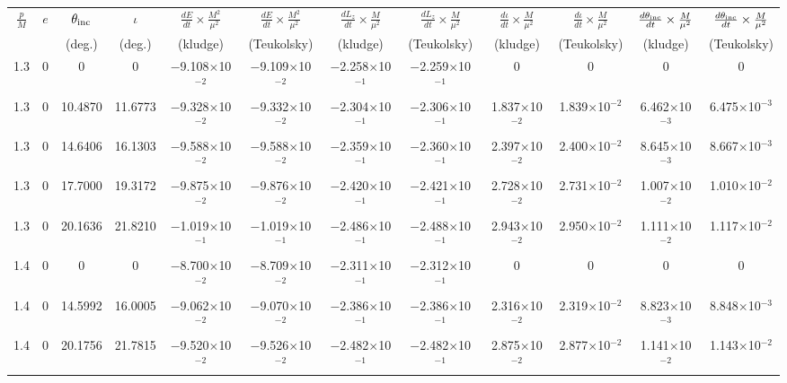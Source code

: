 \documentclass[aps,prd,twocolumn,showpacs,groupedaddress,nofootinbib]{revtex4}
\newcommand\T{\rule{0pt}{3ex}}
\newcommand\B{\rule[-2ex]{0pt}{0pt}}
\begin{document}
\begin{widetext}
\begin{table}[h]
\begin{tabular}{|c|c|c|c|c|c|c|c|c|c|c|c|}
\hline
 \T\B$\frac{p}{M}$ & $e$ & $\theta_{\rm inc}$& $\iota$& $\frac{dE}{dt}\times\frac{M^2}{\mu^2}$ & $\frac{dE}{dt}\times\frac{M^2}{\mu^2}$ & $\frac{dL_z}{dt}\times\frac{M}{\mu^2}$ & $\frac{dL_z}{dt}\times\frac{M}{\mu^2}$ & $\frac{d\iota}{dt}\times\frac{M}{\mu^2}$& $\frac{d\iota}{dt}\times\frac{M}{\mu^2}$& $\frac{d\theta_{\rm inc}}{dt}\times\frac{M}{\mu^2}$& $\frac{d\theta_{\rm inc}}{dt}\times\frac{M}{\mu^2}$\\
&&(deg.)&(deg.)& (kludge) & (Teukolsky) & (kludge) & (Teukolsky)& (kludge) & (Teukolsky)& (kludge) & (Teukolsky)\\
\hline
\T 

  1.3&  0&  0&  0& $-$9.108$\times$10$^{-2}$& $-$9.109$\times$10$^{-2}$& $-$2.258$\times$10$^{-1}$& $-$2.259$\times$10$^{-1}$&  0&  0&  0&  0\\
  1.3&  0& 10.4870& 11.6773& $-$9.328$\times$10$^{-2}$& $-$9.332$\times$10$^{-2}$& $-$2.304$\times$10$^{-1}$& $-$2.306$\times$10$^{-1}$&  1.837$\times$10$^{-2}$&  1.839$\times$10$^{-2}$&  6.462$\times$10$^{-3}$&  6.475$\times$10$^{-3}$\\
  1.3&  0& 14.6406& 16.1303& $-$9.588$\times$10$^{-2}$& $-$9.588$\times$10$^{-2}$& $-$2.359$\times$10$^{-1}$& $-$2.360$\times$10$^{-1}$&  2.397$\times$10$^{-2}$&  2.400$\times$10$^{-2}$&  8.645$\times$10$^{-3}$&  8.667$\times$10$^{-3}$\\
  1.3&  0& 17.7000& 19.3172& $-$9.875$\times$10$^{-2}$& $-$9.876$\times$10$^{-2}$& $-$2.420$\times$10$^{-1}$& $-$2.421$\times$10$^{-1}$&  2.728$\times$10$^{-2}$&  2.731$\times$10$^{-2}$&  1.007$\times$10$^{-2}$&  1.010$\times$10$^{-2}$\\
  1.3&  0& 20.1636& 21.8210& $-$1.019$\times$10$^{-1}$& $-$1.019$\times$10$^{-1}$& $-$2.486$\times$10$^{-1}$& $-$2.488$\times$10$^{-1}$&  2.943$\times$10$^{-2}$&  2.950$\times$10$^{-2}$&  1.111$\times$10$^{-2}$&  1.117$\times$10$^{-2}$\\
  1.4&  0&  0&  0& $-$8.700$\times$10$^{-2}$& $-$8.709$\times$10$^{-2}$& $-$2.311$\times$10$^{-1}$& $-$2.312$\times$10$^{-1}$&  0&  0&  0&  0\\
  1.4&  0& 14.5992& 16.0005& $-$9.062$\times$10$^{-2}$& $-$9.070$\times$10$^{-2}$& $-$2.386$\times$10$^{-1}$& $-$2.386$\times$10$^{-1}$&  2.316$\times$10$^{-2}$&  2.319$\times$10$^{-2}$&  8.823$\times$10$^{-3}$&  8.848$\times$10$^{-3}$\\
  1.4&  0& 20.1756& 21.7815& $-$9.520$\times$10$^{-2}$& $-$9.526$\times$10$^{-2}$& $-$2.482$\times$10$^{-1}$& $-$2.482$\times$10$^{-1}$&  2.875$\times$10$^{-2}$&  2.877$\times$10$^{-2}$&  1.141$\times$10$^{-2}$&  1.143$\times$10$^{-2}$\\

\end{tabular}
\end{table}
\end{widetext}
\end{document}
